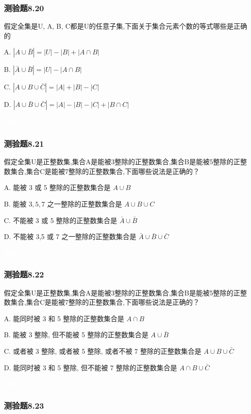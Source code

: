 \documentclass[UTF8, heading=true]{ctexart}
\begin{document}
\subsubsection{测验题8.20}

假定全集是U, A, B, C都是U的任意子集,下面关于集合元素个数的等式哪些是正确的

A. $|A \cup \bar{B}|=|U|-|B|+|A \cap B|$

B. $|\bar{A} \cup \bar{B}|=|U|-|A \cap B|$

C. $|A \cup B \cup \bar{C}|=|A|+|B|-|C|$

D. $|A \cup \bar{B} \cup \bar{C}|=|A|-|B|-|C|+|B \cap C|$

\textcolor{white}{答案：AB}

\subsubsection{测验题8.21}

假定全集U是正整数集,集合A是能被3整除的正整数集合,集合B是能被5整除的正整数集合,集合C是能被7整除的正整数集合,下面哪些说法是正确的？

A. 能被 3 或 5 整除的正整数集合是 $A \cup B$

B. 能被 $3,5,7$ 之一整除的正整数集合是 $A \cup B \cup C$

C. 不能被 3 或 5 整除的正整数集合是 $\bar{A} \cup \bar{B}$

D. 不能被 3,5 或 7 之一整除的正整数集合是 $\bar{A} \cup \bar{B} \cup \bar{C}$

\textcolor{white}{答案：AB}

\subsubsection{测验题8.22}

假定全集U是正整数集,集合A是能被3整除的正整数集合,集合B是能被5整除的正整数集合,集合C是能被7整除的正整数集合,下面哪些说法是正确的？

A. 能同时被 3 和 5 整除的正整数集合是 $A \cap B$

B. 能被 3 整除, 但不能被 5 整除的正整数集合是 $A \cup \bar{B}$

C. 或者被 3 整除, 或者被 5 整除, 或者不被 7 整除的正整数集合是 $A \cup B \cup \bar{C}$

D. 能同时被 3 和 5 整除, 但不能被 7 整除的正整数集合是 $A \cap B \cup \bar{C}$

\textcolor{white}{答案：AC}
\subsubsection{测验题8.23}
\end{document}
